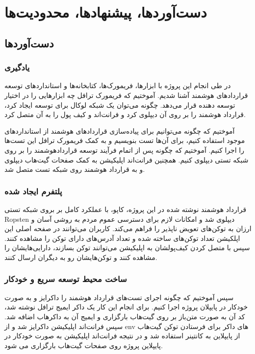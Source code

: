 \chapter{دست‌آوردها، پیشنهاد‌ها، محدودیت‌ها}

\section{دست‌آوردها}

\subsection{یادگیری}
در طی انجام این پروژه با ابزارها، فریمورک‌ها، کتابخانه‌ها و استانداردهای توسعه قراردادهای هوشمند آشنا شدیم. آموختیم که فریمورک ترافل چه ابزارهایی را در اختیار توسعه دهنده قرار می‌دهد. چگونه می‌توان یک شبکه لوکال برای توسعه ایجاد کرد، قرارداد هوشمند را بر روی آن دیپلوی کرد و فرانت‌اند و کیف پول را به آن متصل کرد.

آموختیم که چگونه می‌توانیم برای پیاده‌سازی قراردادهای هوشمند از استانداردهای موجود استفاده کنیم، برای آن‌ها تست بنویسیم و به کمک فریمورک ترافل این تست‌ها را اجرا کنیم. آموختیم که چگونه پس از اتمام فرآیند توسعه قراردادهوشمند را بر روی شبکه تستی دیپلوی کنیم. همچنین فرانت‌اند اپلیکیشن به کمک صفحات گیت‌هاب دیپلوی و به قرارداد هوشمند روی شبکه تست متصل شد.

\subsection{پلتفرم ایجاد شده}
قرارداد هوشمند نوشته شده در این پروژه، کاپو، با عملکرد کامل بر بروی شبکه تستی Ropsten دیپلوی شد و امکانات لازم برای دسترسی عموم مردم به روشی آسان و ارزان به توکن‌های تعویض ناپذیر را فراهم می‌کند. کاربران می‌توانند در صفحه اصلی این اپلکیشن تعداد توکن‌های ساخته شده و تعداد آدرس‌های دارای توکن را مشاهده کنند. سپس با متصل کردن کیف‌پولشان به اپلیکیشن می‌توانند توکن بسازند، دارایی‌هایشان را مشاهده کنند و توکن‌هایشان رو به دیگران ارسال کنند.

\subsection{ساخت محیط توسعه سریع و خودکار}
سپس آموختیم که چگونه اجرای تست‌های قرارداد هوشمند را داکرایز و به صورت خودکار در پایپلان پروژه اجرا کنیم. برای انجام این کار یک داکر ایمیج ترافل نوشته شد، کد آن به صورت متن‌باز بر روی گیت‌هاب بارگزاری و ایمیج آن به داکرهاب اضافه شد. سپس فرانت‌اند اپلیکیشن داکرایز شد و از env های داکر برای فرستادن توکن گیت‌هاب از پایپلاین به کانتینر استفاده شد و در نتیجه فرانت‌اند اپلیکیشن به صورت خودکار در پایپلاین پروژه روی صفحات گیت‌هاب بارگزاری می شود.

